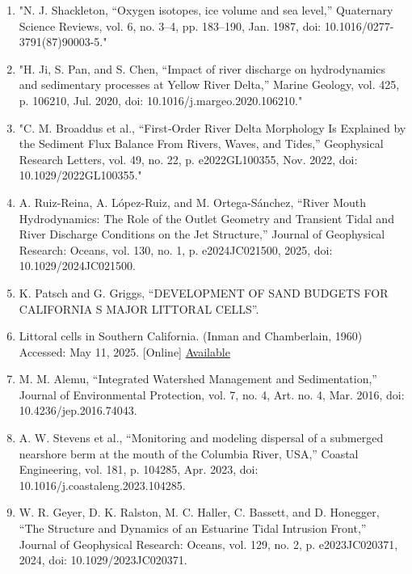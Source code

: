 \documentclass{article}
\begin{document}
\begin{enumerate}
    \item {"N. J. Shackleton, “Oxygen isotopes, ice volume and sea level,” Quaternary Science Reviews, vol. 6, no. 3–4, pp. 183–190, Jan. 1987, doi: 10.1016/0277-3791(87)90003-5."}

    \item {"H. Ji, S. Pan, and S. Chen, “Impact of river discharge on hydrodynamics and sedimentary processes at Yellow River Delta,” Marine Geology, vol. 425, p. 106210, Jul. 2020, doi: 10.1016/j.margeo.2020.106210."}

    \item{"C. M. Broaddus et al., “First‐Order River Delta Morphology Is Explained by the Sediment Flux Balance From Rivers, Waves, and Tides,” Geophysical Research Letters, vol. 49, no. 22, p. e2022GL100355, Nov. 2022, doi: 10.1029/2022GL100355."}

    \item{A. Ruiz-Reina, A. López-Ruiz, and M. Ortega-Sánchez, “River Mouth Hydrodynamics: The Role of the Outlet Geometry and Transient Tidal and River Discharge Conditions on the Jet Structure,” Journal of Geophysical Research: Oceans, vol. 130, no. 1, p. e2024JC021500, 2025, doi: 10.1029/2024JC021500.}

    \item{K. Patsch and G. Griggs, “DEVELOPMENT OF SAND BUDGETS FOR CALIFORNIA S MAJOR LITTORAL CELLS”.}

    \item{Littoral cells in Southern California. (Inman and Chamberlain, 1960) Accessed: May 11, 2025. [Online] \href{https://www.researchgate.net/figure/Littoral-cells-in-Southern-California-Inman-and-Chamberlain-1960-Thurman-and_fig4_240635473}{Available}}

    \item{M. M. Alemu, “Integrated Watershed Management and Sedimentation,” Journal of Environmental Protection, vol. 7, no. 4, Art. no. 4, Mar. 2016, doi: 10.4236/jep.2016.74043.}

    \item{A. W. Stevens et al., “Monitoring and modeling dispersal of a submerged nearshore berm at the mouth of the Columbia River, USA,” Coastal Engineering, vol. 181, p. 104285, Apr. 2023, doi: 10.1016/j.coastaleng.2023.104285.}

    \item{W. R. Geyer, D. K. Ralston, M. C. Haller, C. Bassett, and D. Honegger, “The Structure and Dynamics of an Estuarine Tidal Intrusion Front,” Journal of Geophysical Research: Oceans, vol. 129, no. 2, p. e2023JC020371, 2024, doi: 10.1029/2023JC020371.
    }

\end{enumerate}

\end{document}
